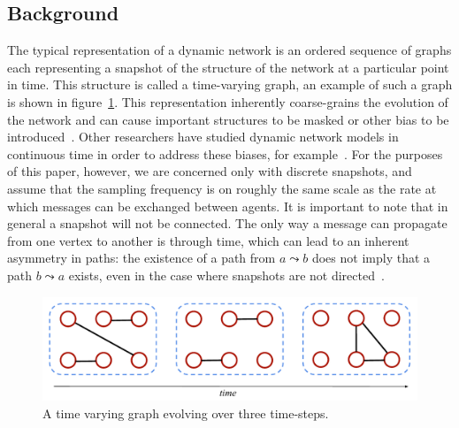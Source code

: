 \documentclass[conference]{IEEEtran}
\begin{document}
\subsection{Background}
The typical representation of a dynamic network is an ordered sequence
of graphs each representing a snapshot of the structure of the network
at a particular point in time. This structure is called a time-varying
graph, an example of such a graph is shown in
figure~\ref{fig:tvg}. This representation inherently coarse-grains the
evolution of the network and can cause important structures to be
masked or other bias to be introduced~\cite{Clauset2007}. Other
researchers have studied dynamic network models in continuous time in
order to address these biases, for example~\cite{Grindrod2014}. For the purposes of
this paper, however, we are concerned only with discrete snapshots,
and assume that the sampling frequency is on roughly the same scale as
the rate at which messages can be exchanged between agents. It is
important to note that in general a snapshot will not be
connected. The only way a message can propagate from one vertex to
another is through time, which can lead to an inherent asymmetry in
paths: the existence of a path from $a \leadsto b$ does not imply that
a path $b \leadsto a$ exists, even in the case where snapshots are not
directed~\cite{Tang2010}.

\begin{figure}
  \includegraphics[width=\columnwidth]{tvg}
  \caption{A time varying graph evolving over three time-steps.}
  \label{fig:tvg}
\end{figure}
\end{document}
